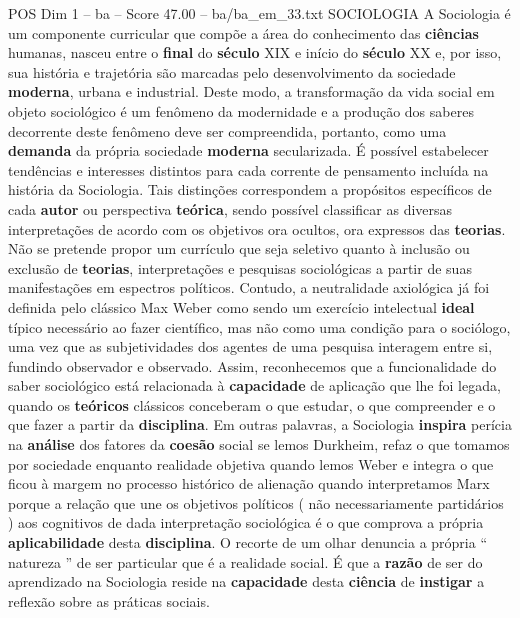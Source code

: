 \begin{textsample}{POS Dim 1 – ba – Score 47.00 – ba/ba\_em\_33.txt}  \label{ex:f1_pos_110}
SOCIOLOGIA A Sociologia é um componente curricular que compõe a área do conhecimento das \textbf{ciências} humanas, nasceu entre o \textbf{final} do \textbf{século} XIX e início do \textbf{século} XX e, por isso, sua história e trajetória são marcadas pelo desenvolvimento da sociedade \textbf{moderna}, urbana e industrial.
Deste modo, a transformação da vida social em objeto sociológico é um fenômeno da modernidade e a produção dos saberes decorrente deste fenômeno deve ser compreendida, portanto, como uma \textbf{demanda} da própria sociedade \textbf{moderna} secularizada.
É possível estabelecer tendências e interesses distintos para cada corrente de pensamento incluída na história da Sociologia.
Tais distinções correspondem a propósitos específicos de cada \textbf{autor} ou perspectiva \textbf{teórica}, sendo possível classificar as diversas interpretações de acordo com os objetivos ora ocultos, ora expressos das \textbf{teorias}.
Não se pretende propor um currículo que seja seletivo quanto à inclusão ou exclusão de \textbf{teorias}, interpretações e pesquisas sociológicas a partir de suas manifestações em espectros políticos.
Contudo, a neutralidade axiológica já foi definida pelo clássico Max Weber como sendo um exercício intelectual \textbf{ideal} típico necessário ao fazer científico, mas não como uma condição para o sociólogo, uma vez que as subjetividades dos agentes de uma pesquisa interagem entre si, fundindo observador e observado.
Assim, reconhecemos que a funcionalidade do saber sociológico está relacionada à \textbf{capacidade} de aplicação que lhe foi legada, quando os \textbf{teóricos} clássicos conceberam o que estudar, o que compreender e o que fazer a partir da \textbf{disciplina}.
Em outras palavras, a Sociologia \textbf{inspira} perícia na \textbf{análise} dos fatores da \textbf{coesão} social se lemos Durkheim, refaz o que tomamos por sociedade enquanto realidade objetiva quando lemos Weber e integra o que ficou à margem no processo histórico de alienação quando interpretamos Marx porque a relação que une os objetivos políticos ( não necessariamente partidários ) aos cognitivos de dada interpretação sociológica é o que comprova a própria \textbf{aplicabilidade} desta \textbf{disciplina}.
O recorte de um olhar denuncia a própria “ natureza ” de ser particular que é a realidade social.
É que a \textbf{razão} de ser do aprendizado na Sociologia reside na \textbf{capacidade} desta \textbf{ciência} de \textbf{instigar} a reflexão sobre as práticas sociais.

\end{textsample}
